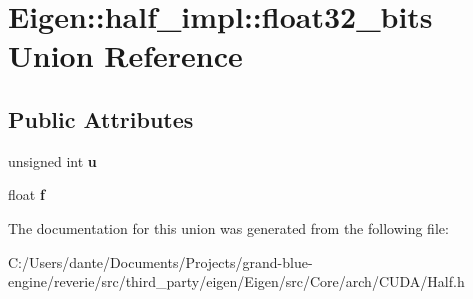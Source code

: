 \hypertarget{union_eigen_1_1half__impl_1_1float32__bits}{}\section{Eigen\+::half\+\_\+impl\+::float32\+\_\+bits Union Reference}
\label{union_eigen_1_1half__impl_1_1float32__bits}
\subsection*{Public Attributes}
\begin{DoxyCompactItemize}
\item 
\mbox{\label{union_eigen_1_1half__impl_1_1float32__bits_ab5c7147d2a8c067dee4a96e86f793bd8}} 
unsigned int {\bfseries u}
\item 
\mbox{\label{union_eigen_1_1half__impl_1_1float32__bits_a10d1c19b9deb1af62803c1be33c3e13a}} 
float {\bfseries f}
\end{DoxyCompactItemize}


The documentation for this union was generated from the following file\+:\begin{DoxyCompactItemize}
\item 
C\+:/\+Users/dante/\+Documents/\+Projects/grand-\/blue-\/engine/reverie/src/third\+\_\+party/eigen/\+Eigen/src/\+Core/arch/\+C\+U\+D\+A/Half.\+h\end{DoxyCompactItemize}
